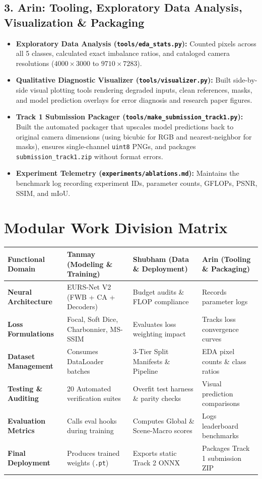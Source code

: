 \documentclass[10pt,a4paper]{article}
\begin{document}
\subsection{3. Arin: Tooling, Exploratory Data Analysis, Visualization \& Packaging}
\begin{itemize}[noitemsep,topsep=1pt]
    \item \textbf{Exploratory Data Analysis (\texttt{tools/eda\_stats.py}):} Counted pixels across all 5 classes, calculated exact imbalance ratios, and cataloged camera resolutions ($4000 \times 3000$ to $9710 \times 7283$).
    \item \textbf{Qualitative Diagnostic Visualizer (\texttt{tools/visualizer.py}):} Built side-by-side visual plotting tools rendering degraded inputs, clean references, masks, and model prediction overlays for error diagnosis and research paper figures.
    \item \textbf{Track 1 Submission Packager (\texttt{tools/make\_submission\_track1.py}):} Built the automated packager that upscales model predictions back to original camera dimensions (using bicubic for RGB and nearest-neighbor for masks), ensures single-channel \texttt{uint8} PNGs, and packages \texttt{submission\_track1.zip} without format errors.
    \item \textbf{Experiment Telemetry (\texttt{experiments/ablations.md}):} Maintains the benchmark log recording experiment IDs, parameter counts, GFLOPs, PSNR, SSIM, and mIoU.
\end{itemize}

\section{Modular Work Division Matrix}
\begin{center}
\small
\begin{tabularx}{\textwidth}{p{3.2cm}XXX}
\toprule
\textbf{Functional Domain} & \textbf{Tanmay (Modeling \& Training)} & \textbf{Shubham (Data \& Deployment)} & \textbf{Arin (Tooling \& Packaging)} \\
\midrule
\textbf{Neural Architecture} & EURS-Net V2 (FWB + CA + Decoders) & Budget audits \& FLOP compliance & Records parameter logs \\
\textbf{Loss Formulations} & Focal, Soft Dice, Charbonnier, MS-SSIM & Evaluates loss weighting impact & Tracks loss convergence curves \\
\textbf{Dataset Management} & Consumes DataLoader batches & 3-Tier Split Manifests \& Pipeline & EDA pixel counts \& class ratios \\
\textbf{Testing \& Auditing} & 20 Automated verification suites & Overfit test harness \& parity checks & Visual prediction comparisons \\
\textbf{Evaluation Metrics} & Calls eval hooks during training & Computes Global \& Scene-Macro scores & Logs leaderboard benchmarks \\
\textbf{Final Deployment} & Produces trained weights (\texttt{.pt}) & Exports static Track 2 ONNX & Packages Track 1 submission ZIP \\
\bottomrule
\end{tabularx}
\end{center}
\end{document}
